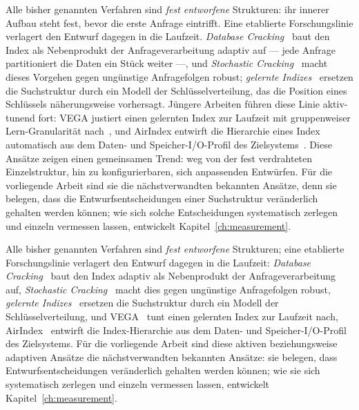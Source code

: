 \begin{nurlang}
Alle bisher genannten Verfahren sind \emph{fest entworfene} Strukturen: ihr innerer Aufbau steht fest,
bevor die erste Anfrage eintrifft. Eine etablierte Forschungslinie verlagert den Entwurf dagegen in die
Laufzeit\@. \emph{Database Cracking}~\cite{idreos2007cracking} baut den Index als Nebenprodukt der
Anfrageverarbeitung adaptiv auf --- jede Anfrage partitioniert die Daten ein Stück weiter ---, und
\emph{Stochastic Cracking}~\cite{halim2012stochastic} macht dieses Vorgehen gegen ungünstige
Anfragefolgen robust; \emph{gelernte Indizes}~\cite{kraska2018learned} ersetzen die Suchstruktur durch
ein Modell der Schlüsselverteilung, das die Position eines Schlüssels näherungsweise vorhersagt. Jüngere
Arbeiten führen diese Linie aktiv-tunend fort: VEGA justiert einen gelernten Index zur Laufzeit mit
gruppenweiser Lern-Granularität nach~\cite{li2025vega}, und AirIndex entwirft die Hierarchie eines Index
automatisch aus dem Daten- und Speicher-I/O-Profil des Zielsystems~\cite{chockchowwat2023airindex}. Diese
Ansätze zeigen einen gemeinsamen Trend: weg von der fest verdrahteten Einzelstruktur, hin zu
konfigurierbaren, sich anpassenden Entwürfen. Für die vorliegende Arbeit sind sie die nächstverwandten
bekannten Ansätze, denn sie belegen, dass die Entwurfsentscheidungen einer Suchstruktur veränderlich
gehalten werden können; wie sich solche Entscheidungen systematisch zerlegen und einzeln vermessen
lassen, entwickelt Kapitel~\ref{ch:measurement}.
\end{nurlang}
\begin{nurkurz}
Alle bisher genannten Verfahren sind \emph{fest entworfene} Strukturen; eine etablierte Forschungslinie verlagert
den Entwurf dagegen in die Laufzeit: \emph{Database Cracking}~\cite{idreos2007cracking} baut den Index adaptiv als
Nebenprodukt der Anfrageverarbeitung auf, \emph{Stochastic Cracking}~\cite{halim2012stochastic} macht dies gegen
ungünstige Anfragefolgen robust, \emph{gelernte Indizes}~\cite{kraska2018learned} ersetzen die Suchstruktur durch
ein Modell der Schlüsselverteilung, und VEGA~\cite{li2025vega} tunt einen gelernten Index zur Laufzeit nach,
AirIndex~\cite{chockchowwat2023airindex} entwirft die Index-Hierarchie aus dem Daten- und Speicher-I/O-Profil des
Zielsystems. Für die vorliegende Arbeit sind diese aktiven beziehungsweise adaptiven Ansätze die nächstverwandten
bekannten Ansätze: sie belegen, dass Entwurfsentscheidungen veränderlich gehalten werden können; wie sie sich
systematisch zerlegen und einzeln vermessen lassen, entwickelt Kapitel~\ref{ch:measurement}.
\end{nurkurz}


